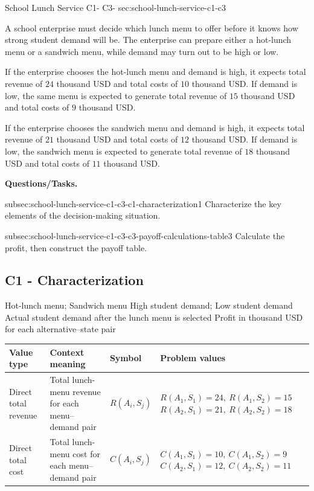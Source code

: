 	\sectionScored
	{School Lunch Service}
	{C1- \hspace{2mm} C3-}
	{sec:school-lunch-service-c1-c3}
	{
	A school enterprise must decide which lunch menu to offer before it knows how strong student demand will be. The enterprise can prepare either a hot-lunch menu or a sandwich menu, while demand may turn out to be high or low.

	If the enterprise chooses the hot-lunch menu and demand is high, it expects total revenue of \(24\) thousand USD and total costs of \(10\) thousand USD. If demand is low, the same menu is expected to generate total revenue of \(15\) thousand USD and total costs of \(9\) thousand USD.

	If the enterprise chooses the sandwich menu and demand is high, it expects total revenue of \(21\) thousand USD and total costs of \(12\) thousand USD. If demand is low, the sandwich menu is expected to generate total revenue of \(18\) thousand USD and total costs of \(11\) thousand USD.

	\textbf{Questions/Tasks.}
	\begin{enumerate}
		\CriterionTask
		{subsec:school-lunch-service-c1-c3-c1-characterization}{1}
		{Characterize the key elements of the decision-making situation. }

		\CriterionTask
		{subsec:school-lunch-service-c1-c3-c3-payoff-calculations-table}{3}
		{Calculate the profit, then construct the payoff table. }
	\end{enumerate}

	\label{subsec:school-lunch-service-c1-c3-c1-characterization}
	\subsection*{C1 - Characterization }
	
	\DecisionElementsTable
		{Hot-lunch menu; Sandwich menu}
		{High student demand; Low student demand}
		{Actual student demand after the lunch menu is selected}
		{Profit in thousand USD for each alternative--state pair}

	\begin{center}
	\small
	\begin{tabularx}{\textwidth}{@{}>{\raggedright\arraybackslash}p{}>{\raggedright\arraybackslash}p{}>{\raggedright\arraybackslash}p{}>{\raggedright\arraybackslash}X@{}}
	\toprule
	Value type & Context meaning & Symbol & Problem values \\
	\midrule
	Direct total revenue
	& Total lunch-menu revenue for each menu--demand pair
	& \(R(A_i,S_j)\)
	& \(R(A_1,S_1)=24,\ R(A_1,S_2)=15\)\newline
	  \(R(A_2,S_1)=21,\ R(A_2,S_2)=18\) \\
	Direct total cost
	& Total lunch-menu cost for each menu--demand pair
	& \(C(A_i,S_j)\)
	& \(C(A_1,S_1)=10,\ C(A_1,S_2)=9\)\newline
	  \(C(A_2,S_1)=12,\ C(A_2,S_2)=11\) \\
	\bottomrule
	\end{tabularx}
	\end{center}

}
